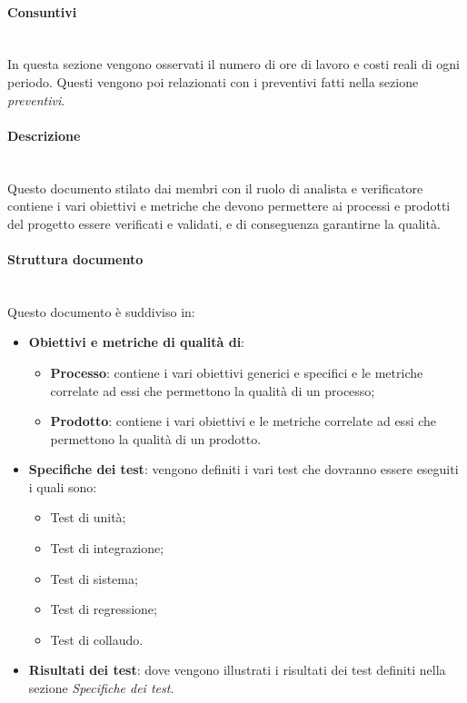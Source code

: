 \paragraph {Consuntivi}\mbox{}\\
In questa sezione vengono osservati il numero di ore di lavoro e costi reali di ogni periodo. Questi vengono poi relazionati con i preventivi fatti nella sezione \textit{preventivi}.

\paragraph {Descrizione}\mbox{}\\
Questo documento stilato dai membri con il ruolo di analista e verificatore contiene i vari obiettivi e metriche che devono permettere ai processi e prodotti del progetto essere verificati e validati, e di conseguenza garantirne la qualità.
\paragraph {Struttura documento}\mbox{}\\
Questo documento è suddiviso in:
\begin{itemize}
	\item \textbf{Obiettivi e metriche di qualità di}:
	\begin{itemize}
		\item \textbf{Processo}: contiene i vari obiettivi generici e specifici e le metriche correlate ad essi che permettono la qualità di un processo;
		\item \textbf{Prodotto}: contiene i vari obiettivi e le metriche correlate ad essi che permettono la qualità di un prodotto.
	\end{itemize}
	\item \textbf{Specifiche dei test}: vengono definiti i vari test che dovranno essere eseguiti i quali sono:
	\begin{itemize}
		\item Test di unità;
		\item Test di integrazione;
		\item Test di sistema;
		\item Test di regressione;
		\item Test di collaudo.
	\end{itemize}
	\item \textbf{Risultati dei test}: dove vengono illustrati i risultati dei test definiti nella sezione \textit{Specifiche dei test}.
\end{itemize} 
